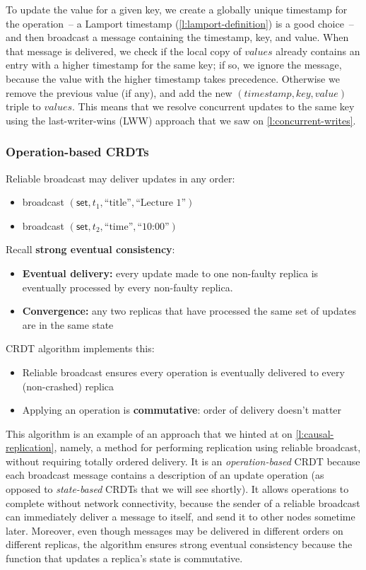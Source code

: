 To update the value for a given key, we create a globally unique timestamp for the operation~-- a Lamport timestamp (\autoref{l:lamport-definition}) is a good choice~-- and then broadcast a message containing the timestamp, key, and value.
When that message is delivered, we check if the local copy of $\mathit{values}$ already contains an entry with a higher timestamp for the same key; if so, we ignore the message, because the value with the higher timestamp takes precedence.
Otherwise we remove the previous value (if any), and add the new $(\mathit{timestamp}, \mathit{key}, \mathit{value})$ triple to $\mathit{values}$.
This means that we resolve concurrent updates to the same key using the last-writer-wins (LWW) approach that we saw on \autoref{l:concurrent-writes}.

\begin{frame}
    \label{s:op-crdt}
    \frametitle{Operation-based CRDTs}
    Reliable broadcast may deliver updates in any order:
    \begin{itemize}
        \item broadcast $(\mathsf{set}, t_1, \text{``title''}, \text{``Lecture 1''})$
        \item broadcast $(\mathsf{set}, t_2, \text{``time''}, \text{``10:00''})$\\[1em]\pause
    \end{itemize}
    Recall \textbf{strong eventual consistency}:
    \begin{itemize}
        \item \textbf{Eventual delivery:} every update made to one non-faulty replica is eventually processed by every non-faulty replica.
        \item \textbf{Convergence:} any two replicas that have processed the same set of updates are in the same state\\[1em]\pause
    \end{itemize}
    CRDT algorithm implements this:
    \begin{itemize}
        \item Reliable broadcast ensures every operation is eventually delivered to every (non-crashed) replica\pause
        \item Applying an operation is \textbf{commutative}: order of delivery doesn't matter
    \end{itemize}
\end{frame}
\label{l:op-crdt}

This algorithm is an example of an approach that we hinted at on \autoref{l:causal-replication}, namely, a method for performing replication using reliable broadcast, without requiring totally ordered delivery.
It is an \emph{operation-based} CRDT because each broadcast message contains a description of an update operation (as opposed to \emph{state-based} CRDTs that we will see shortly).
It allows operations to complete without network connectivity, because the sender of a reliable broadcast can immediately deliver a message to itself, and send it to other nodes sometime later.
Moreover, even though messages may be delivered in different orders on different replicas, the algorithm ensures strong eventual consistency because the function that updates a replica's state is commutative.

